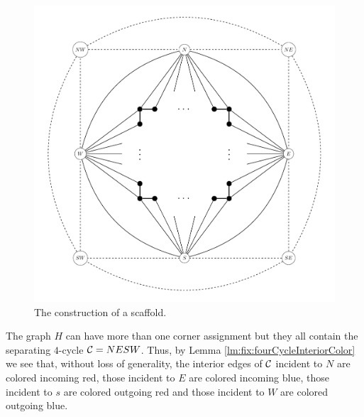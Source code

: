   \begin{figure}[t]
  \centering
  \includegraphics[scale=0.5]{fixExtension/img/scafold}

  \caption{The construction of a scaffold.
      \label{fig:scafold}}
  \end{figure}


  The graph $H$ can have more than one corner assignment but they all contain the separating $4$-cycle $\mathcal{C}= NESW$. Thus, by Lemma \ref{lm:fix:fourCycleInteriorColor} we see that, without loss of generality, the interior edges of $\mathcal{C}$ incident to $N$ are colored incoming red, those incident to $E$ are colored incoming blue, those incident to $s$ are colored outgoing red and those incident to $W$ are colored outgoing blue.

